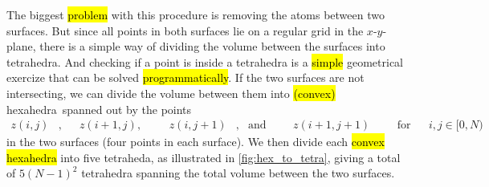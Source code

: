 The biggest \hl{problem} with this procedure is removing the atoms between two surfaces. But since all points in both surfaces lie on a regular grid in the $x$-$y$-plane, there is a simple way of dividing the volume between the surfaces into tetrahedra. And checking if a point is inside a tetrahedra is a \hl{simple} geometrical exercize that can be solved \hl{programmatically}. If the two surfaces are not intersecting, we can divide the volume between them into \hl{(convex)} hexahedra\ spanned out by the points
\begin{align*}
    z(i,j)&, & &z(i+1,j),& & &z(i,j+1)&, &\text{and}& & &z(i+1,j+1)& & &\text{for} & &i,j \in [0,N)
\end{align*}
in the two surfaces (four points in each surface). We then divide each \hl{convex hexahedra} into five tetraheda, as illustrated in \cref{fig:hex_to_tetra}, giving a total of $5(N-1)^2$ tetrahedra spanning the total volume between the two surfaces.
%
%
